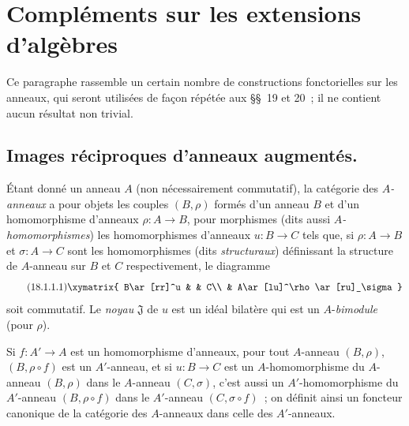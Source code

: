 \section{Compléments sur les extensions d'algèbres}
\label{section:0.18-fr}

Ce paragraphe rassemble un certain nombre de constructions fonctorielles sur
les anneaux, qui seront utilisées de façon répétée aux \S\S~19 et 20~; il ne
contient aucun résultat non trivial.

\subsection{Images réciproques d'anneaux augmentés.}
\label{subsection:0.18.1-fr}

\begin{env}[18.1.1]
\label{0.18.1.1-fr}
Étant donné un anneau $A$ (non nécessairement commutatif), la catégorie des
\emph{$A$-anneaux} a pour objets les couples $(B,\rho)$ formés d'un anneau
$B$ et d'un homomorphisme d'anneaux $\rho:A\to B$, pour morphismes (dits aussi
\emph{$A$-homomorphismes}) les homomorphismes d'anneaux $u:B\to C$ tels que,
si $\rho:A\to B$ et $\sigma:A\to C$ sont les homomorphismes (dits
\emph{structuraux}) définissant la structure de $A$-anneau sur $B$ et $C$
respectivement, le diagramme
\begin{equation}
\label{0.18.1.1.1-fr}
\tag{18.1.1.1}
  \xymatrix{
    B\ar[rr]^u & & C\\
    & A\ar[lu]^\rho\ar[ru]_\sigma
  }
\end{equation}
soit commutatif. Le \emph{noyau} $\mathfrak{J}$ de $u$ est un idéal bilatère
qui est un $A$-\emph{bimodule} (pour $\rho$).

Si $f:A'\to A$ est un homomorphisme d'anneaux, pour tout $A$-anneau
$(B,\rho)$, $(B,\rho\circ f)$ est un $A'$-anneau, et si $u:B\to C$ est un
$A$-homomorphisme du $A$-anneau $(B,\rho)$
dans le $A$-anneau $(C,\sigma)$, c'est aussi un $A'$-homomorphisme du
$A'$-anneau $(B,\rho\circ f)$ dans le $A'$-anneau $(C,\sigma\circ f)$~; on
définit ainsi un foncteur canonique de la catégorie des $A$-anneaux dans celle
des $A'$-anneaux.
\end{env}

